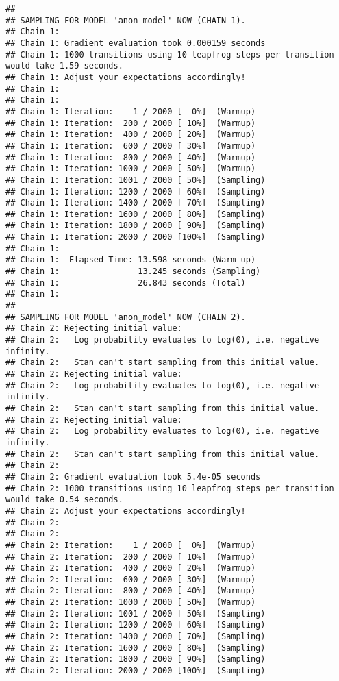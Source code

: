 \documentclass[
]{article}
\begin{document}
\begin{verbatim}
## 
## SAMPLING FOR MODEL 'anon_model' NOW (CHAIN 1).
## Chain 1: 
## Chain 1: Gradient evaluation took 0.000159 seconds
## Chain 1: 1000 transitions using 10 leapfrog steps per transition would take 1.59 seconds.
## Chain 1: Adjust your expectations accordingly!
## Chain 1: 
## Chain 1: 
## Chain 1: Iteration:    1 / 2000 [  0%]  (Warmup)
## Chain 1: Iteration:  200 / 2000 [ 10%]  (Warmup)
## Chain 1: Iteration:  400 / 2000 [ 20%]  (Warmup)
## Chain 1: Iteration:  600 / 2000 [ 30%]  (Warmup)
## Chain 1: Iteration:  800 / 2000 [ 40%]  (Warmup)
## Chain 1: Iteration: 1000 / 2000 [ 50%]  (Warmup)
## Chain 1: Iteration: 1001 / 2000 [ 50%]  (Sampling)
## Chain 1: Iteration: 1200 / 2000 [ 60%]  (Sampling)
## Chain 1: Iteration: 1400 / 2000 [ 70%]  (Sampling)
## Chain 1: Iteration: 1600 / 2000 [ 80%]  (Sampling)
## Chain 1: Iteration: 1800 / 2000 [ 90%]  (Sampling)
## Chain 1: Iteration: 2000 / 2000 [100%]  (Sampling)
## Chain 1: 
## Chain 1:  Elapsed Time: 13.598 seconds (Warm-up)
## Chain 1:                13.245 seconds (Sampling)
## Chain 1:                26.843 seconds (Total)
## Chain 1: 
## 
## SAMPLING FOR MODEL 'anon_model' NOW (CHAIN 2).
## Chain 2: Rejecting initial value:
## Chain 2:   Log probability evaluates to log(0), i.e. negative infinity.
## Chain 2:   Stan can't start sampling from this initial value.
## Chain 2: Rejecting initial value:
## Chain 2:   Log probability evaluates to log(0), i.e. negative infinity.
## Chain 2:   Stan can't start sampling from this initial value.
## Chain 2: Rejecting initial value:
## Chain 2:   Log probability evaluates to log(0), i.e. negative infinity.
## Chain 2:   Stan can't start sampling from this initial value.
## Chain 2: 
## Chain 2: Gradient evaluation took 5.4e-05 seconds
## Chain 2: 1000 transitions using 10 leapfrog steps per transition would take 0.54 seconds.
## Chain 2: Adjust your expectations accordingly!
## Chain 2: 
## Chain 2: 
## Chain 2: Iteration:    1 / 2000 [  0%]  (Warmup)
## Chain 2: Iteration:  200 / 2000 [ 10%]  (Warmup)
## Chain 2: Iteration:  400 / 2000 [ 20%]  (Warmup)
## Chain 2: Iteration:  600 / 2000 [ 30%]  (Warmup)
## Chain 2: Iteration:  800 / 2000 [ 40%]  (Warmup)
## Chain 2: Iteration: 1000 / 2000 [ 50%]  (Warmup)
## Chain 2: Iteration: 1001 / 2000 [ 50%]  (Sampling)
## Chain 2: Iteration: 1200 / 2000 [ 60%]  (Sampling)
## Chain 2: Iteration: 1400 / 2000 [ 70%]  (Sampling)
## Chain 2: Iteration: 1600 / 2000 [ 80%]  (Sampling)
## Chain 2: Iteration: 1800 / 2000 [ 90%]  (Sampling)
## Chain 2: Iteration: 2000 / 2000 [100%]  (Sampling)

\end{verbatim}
\end{document}
